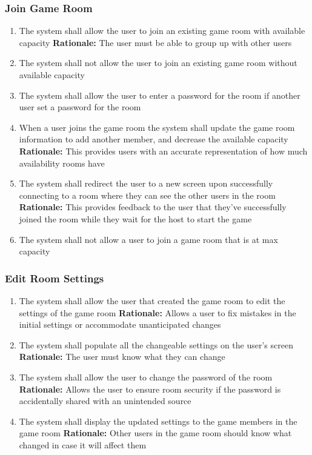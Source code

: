 \documentclass[12pt]{article}
\begin{document}
\subsubsection{Join Game Room}
\begin{enumerate}[label=JG\arabic*., series=JoinGame]
	\item The system shall allow the user to join an existing game room with available capacity \newline 
    \textbf{Rationale:} The user must be able to group up with other users
    \item The system shall not allow the user to join an existing game room without available capacity 
    \item The system shall allow the user to enter a password for the room if another user set a password for the room 
    \item When a user joins the game room the system shall update the game room information to add another member, and decrease the available capacity\newline 
    \textbf{Rationale:} This provides users with an accurate representation of how much availability rooms have
    \item The system shall redirect the user to a new screen upon successfully connecting to a room where they can see the other users in the room\newline 
    \textbf{Rationale:} This provides feedback to the user that they've successfully joined the room while they wait for the host to start the game
    \item The system shall not allow a user to join a game room that is at max capacity\newline
\end{enumerate}

\subsubsection{Edit Room Settings}
\begin{enumerate}[label=RS\arabic*., series=EditRoom]
	\item The system shall allow the user that created the game room to edit the settings of the game room\newline 
    \textbf{Rationale:} Allows a user to fix mistakes in the initial settings or accommodate unanticipated changes
    \item The system shall populate all the changeable settings on the user's screen\newline 
    \textbf{Rationale:} The user must know what they can change
    \item The system shall allow the user to change the password of the room\newline 
    \textbf{Rationale:} Allows the user to ensure room security if the password is accidentally shared with an unintended source
    \item The system shall display the updated settings to the game members in the game room\newline 
    \textbf{Rationale:} Other users in the game room should know what changed in case it will affect them
\end{enumerate}
\end{document}
